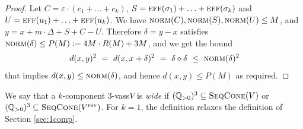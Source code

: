 \documentclass[a4paper, UKenglish, cleveref, autoref, thm-restate]{lipics-v2021}
\newcommand{\Q}{\mathbb{Q}}
\newcommand{\Qpos}{\Q_{>0}}
\newcommand{\norm}{\textsc{norm}}
\newcommand{\eff}{\textsc{eff}}
\newcommand{\eps}{\varepsilon}
\newcommand{\vass}{{\sc vass}\xspace}
\newcommand{\tvass}{\parvass 3}
\newcommand{\parvass}[1]{{$#1$-\vass}\xspace}
\newcommand{\rev}[1]{{#1}^{\text{rev}}}
\newcommand{\seqcone}[1]{\textsc{SeqCone}(#1)}
\newcommand{\innprod}[2]{#1 \diamond #2} \newcommand{\pair}[2]{#1_{#2}}
\begin{document}
\begin{proof}
Let $C = \eps \cdot (c_1 + \ldots + c_k)$, 
$S = \eff(\sigma_1) + \ldots + \eff(\sigma_k)$ and $U=\eff(u_1) + \ldots + \eff(u_k)$. 
We have $\norm(C), \norm(S), \norm(U) \leq M$, and
$y = x + m\cdot \Delta + S + C - U$.
Therefore $\delta = y - x$ satisfies $\norm(\delta) \leq P(M) := 4M\cdot R(M) + 3M$, and we get the bound
\begin{align*}
d(x, y)^2 \ = \ d(x, x + \delta)^2 \ = \ \innprod \delta \delta \ \leq \ \norm(\delta)^2  
\end{align*}
that implies $d(x,y) \leq \norm(\delta)$, and hence $d(x,y) \leq P(M)$ as required.
\end{proof}
We say that a $k$-component \tvass $V$ is \emph{wide} if $(\Qpos)^3 \subseteq \seqcone V$
or $(\Qpos)^3 \subseteq \seqcone {\rev V}$.
For $k=1$, the definition relaxes the definition of Section \ref{sec:1comp}. 
\end{document}
